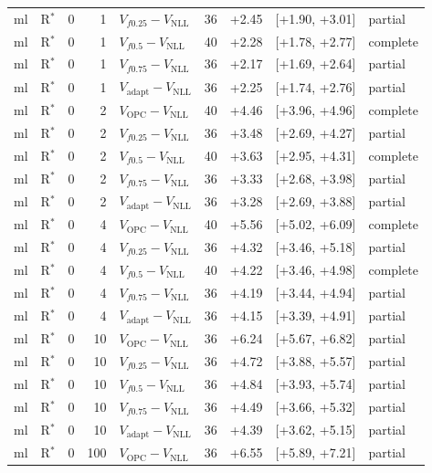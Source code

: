 \documentclass[10pt,a4paper]{article}
\begin{document}
{\begin{longtable}{llrrlrrrl}
ml & R$^*$ & 0 & 1 & $V_{f0.25}-V_{\mathrm{NLL}}$ & 36 & +2.45 & [+1.90, +3.01] & partial \\
ml & R$^*$ & 0 & 1 & $V_{f0.5}-V_{\mathrm{NLL}}$ & 40 & +2.28 & [+1.78, +2.77] & complete \\
ml & R$^*$ & 0 & 1 & $V_{f0.75}-V_{\mathrm{NLL}}$ & 36 & +2.17 & [+1.69, +2.64] & partial \\
ml & R$^*$ & 0 & 1 & $V_{\mathrm{adapt}}-V_{\mathrm{NLL}}$ & 36 & +2.25 & [+1.74, +2.76] & partial \\
ml & R$^*$ & 0 & 2 & $V_{\mathrm{OPC}}-V_{\mathrm{NLL}}$ & 40 & +4.46 & [+3.96, +4.96] & complete \\
ml & R$^*$ & 0 & 2 & $V_{f0.25}-V_{\mathrm{NLL}}$ & 36 & +3.48 & [+2.69, +4.27] & partial \\
ml & R$^*$ & 0 & 2 & $V_{f0.5}-V_{\mathrm{NLL}}$ & 40 & +3.63 & [+2.95, +4.31] & complete \\
ml & R$^*$ & 0 & 2 & $V_{f0.75}-V_{\mathrm{NLL}}$ & 36 & +3.33 & [+2.68, +3.98] & partial \\
ml & R$^*$ & 0 & 2 & $V_{\mathrm{adapt}}-V_{\mathrm{NLL}}$ & 36 & +3.28 & [+2.69, +3.88] & partial \\
ml & R$^*$ & 0 & 4 & $V_{\mathrm{OPC}}-V_{\mathrm{NLL}}$ & 40 & +5.56 & [+5.02, +6.09] & complete \\
ml & R$^*$ & 0 & 4 & $V_{f0.25}-V_{\mathrm{NLL}}$ & 36 & +4.32 & [+3.46, +5.18] & partial \\
ml & R$^*$ & 0 & 4 & $V_{f0.5}-V_{\mathrm{NLL}}$ & 40 & +4.22 & [+3.46, +4.98] & complete \\
ml & R$^*$ & 0 & 4 & $V_{f0.75}-V_{\mathrm{NLL}}$ & 36 & +4.19 & [+3.44, +4.94] & partial \\
ml & R$^*$ & 0 & 4 & $V_{\mathrm{adapt}}-V_{\mathrm{NLL}}$ & 36 & +4.15 & [+3.39, +4.91] & partial \\
ml & R$^*$ & 0 & 10 & $V_{\mathrm{OPC}}-V_{\mathrm{NLL}}$ & 36 & +6.24 & [+5.67, +6.82] & partial \\
ml & R$^*$ & 0 & 10 & $V_{f0.25}-V_{\mathrm{NLL}}$ & 36 & +4.72 & [+3.88, +5.57] & partial \\
ml & R$^*$ & 0 & 10 & $V_{f0.5}-V_{\mathrm{NLL}}$ & 36 & +4.84 & [+3.93, +5.74] & partial \\
ml & R$^*$ & 0 & 10 & $V_{f0.75}-V_{\mathrm{NLL}}$ & 36 & +4.49 & [+3.66, +5.32] & partial \\
ml & R$^*$ & 0 & 10 & $V_{\mathrm{adapt}}-V_{\mathrm{NLL}}$ & 36 & +4.39 & [+3.62, +5.15] & partial \\
ml & R$^*$ & 0 & 100 & $V_{\mathrm{OPC}}-V_{\mathrm{NLL}}$ & 36 & +6.55 & [+5.89, +7.21] & partial \\

\end{longtable}}
\end{document}
